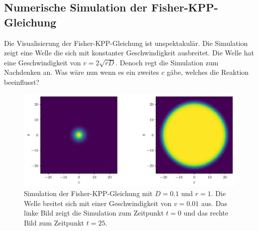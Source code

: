 \subsection{Numerische Simulation der Fisher-KPP-Gleichung
\label{reaktdiff:subsection:fkppsimulation}}
Die Visualisierung der Fisher-KPP-Gleichung ist unspektakulär.
Die Simulation zeigt eine Welle die sich mit konstanter Geschwindigkeit ausbreitet.
Die Welle hat eine Geschwindigkeit von \(v = 2\sqrt{rD}\).
Denoch regt die Simulation zum Nachdenken an.
Was wäre nun wenn es ein zweites \(c\) gäbe, welches die Reaktion beeinflusst?
\begin{figure}
\centering
\includegraphics[width=\textwidth]{papers/reaktdiff/images/Fisher_KPP/fisher_kpp_2d_wave_comparison.pdf}
\caption{Simulation der Fisher-KPP-Gleichung mit \(D = 0.1\) und \(r = 1\). Die Welle breitet sich mit einer Geschwindigkeit von \(v = 0.01\) aus. Das linke Bild zeigt die Simulation zum Zeitpunkt \(t = 0\) und das rechte Bild zum Zeitpunkt \(t = 25\).}
\label{reaktdiff:figure:fisher_kpp_simulation}
\end{figure}